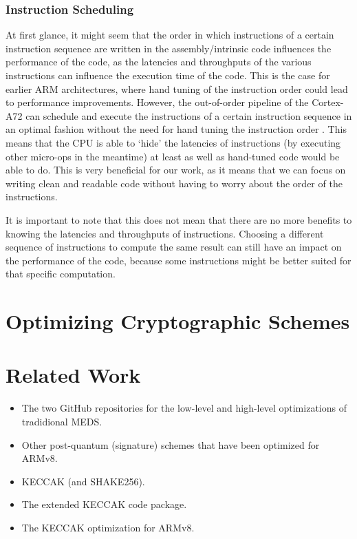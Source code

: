 \documentclass[11pt,a4paper]{report}
\theoremstyle{definition}
\begin{document}
\subsubsection{Instruction Scheduling}
At first glance, it might seem that the order in which instructions of a certain instruction sequence are written in the assembly/intrinsic code influences the performance of the code, as the latencies and throughputs of the various instructions can influence the execution time of the code. This is the case for earlier ARM architectures, where hand tuning of the instruction order could lead to performance improvements. However, the out-of-order pipeline of the Cortex-A72 can schedule and execute the instructions of a certain instruction sequence in an optimal fashion without the need for hand tuning the instruction order \cite{CortexA72OptGuide}. This means that the CPU is able to `hide' the latencies of instructions (by executing other micro-ops in the meantime) at least as well as hand-tuned code would be able to do. This is very beneficial for our work, as it means that we can focus on writing clean and readable code without having to worry about the order of the instructions.

It is important to note that this does not mean that there are no more benefits to knowing the latencies and throughputs of instructions. Choosing a different sequence of instructions to compute the same result can still have an impact on the performance of the code, because some instructions might be better suited for that specific computation.

\section{Optimizing Cryptographic Schemes}

\section{Related Work}
\begin{itemize}
  \item The two GitHub repositories for the low-level and high-level optimizations of tradidional MEDS.
  \item Other post-quantum (signature) schemes that have been optimized for ARMv8.
  \item KECCAK (and SHAKE256).
  \item The extended KECCAK code package.
  \item The KECCAK optimization for ARMv8.
\end{itemize}
\end{document}
